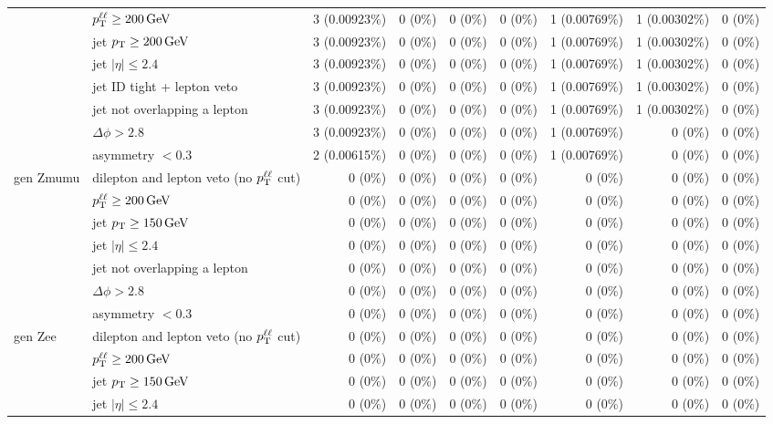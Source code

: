 \begin{tabular}{llrrrrrrr}
 & $p_{\mathrm{T}}^{\ell\ell} \geq 200\,\mathrm{GeV}$ & 3 (0.00923\%) & 0 (0\%) & 0 (0\%) & 0 (0\%) & 1 (0.00769\%) & 1 (0.00302\%) & 0 (0\%) \\
 & jet $p_{\mathrm{T}} \geq 200\,\mathrm{GeV}$ & 3 (0.00923\%) & 0 (0\%) & 0 (0\%) & 0 (0\%) & 1 (0.00769\%) & 1 (0.00302\%) & 0 (0\%) \\
 & jet $|\eta| \leq 2.4$ & 3 (0.00923\%) & 0 (0\%) & 0 (0\%) & 0 (0\%) & 1 (0.00769\%) & 1 (0.00302\%) & 0 (0\%) \\
 & jet ID tight + lepton veto & 3 (0.00923\%) & 0 (0\%) & 0 (0\%) & 0 (0\%) & 1 (0.00769\%) & 1 (0.00302\%) & 0 (0\%) \\
 & jet not overlapping a lepton & 3 (0.00923\%) & 0 (0\%) & 0 (0\%) & 0 (0\%) & 1 (0.00769\%) & 1 (0.00302\%) & 0 (0\%) \\
 & $\Delta\phi > 2.8$ & 3 (0.00923\%) & 0 (0\%) & 0 (0\%) & 0 (0\%) & 1 (0.00769\%) & 0 (0\%) & 0 (0\%) \\
 & asymmetry $< 0.3$ & 2 (0.00615\%) & 0 (0\%) & 0 (0\%) & 0 (0\%) & 1 (0.00769\%) & 0 (0\%) & 0 (0\%) \\
\midrule
gen Zmumu & dilepton and lepton veto (no $p_{\mathrm{T}}^{\ell\ell}$ cut) & 0 (0\%) & 0 (0\%) & 0 (0\%) & 0 (0\%) & 0 (0\%) & 0 (0\%) & 0 (0\%) \\
 & $p_{\mathrm{T}}^{\ell\ell} \geq 200\,\mathrm{GeV}$ & 0 (0\%) & 0 (0\%) & 0 (0\%) & 0 (0\%) & 0 (0\%) & 0 (0\%) & 0 (0\%) \\
 & jet $p_{\mathrm{T}} \geq 150\,\mathrm{GeV}$ & 0 (0\%) & 0 (0\%) & 0 (0\%) & 0 (0\%) & 0 (0\%) & 0 (0\%) & 0 (0\%) \\
 & jet $|\eta| \leq 2.4$ & 0 (0\%) & 0 (0\%) & 0 (0\%) & 0 (0\%) & 0 (0\%) & 0 (0\%) & 0 (0\%) \\
 & jet not overlapping a lepton & 0 (0\%) & 0 (0\%) & 0 (0\%) & 0 (0\%) & 0 (0\%) & 0 (0\%) & 0 (0\%) \\
 & $\Delta\phi > 2.8$ & 0 (0\%) & 0 (0\%) & 0 (0\%) & 0 (0\%) & 0 (0\%) & 0 (0\%) & 0 (0\%) \\
 & asymmetry $< 0.3$ & 0 (0\%) & 0 (0\%) & 0 (0\%) & 0 (0\%) & 0 (0\%) & 0 (0\%) & 0 (0\%) \\
\midrule
gen Zee & dilepton and lepton veto (no $p_{\mathrm{T}}^{\ell\ell}$ cut) & 0 (0\%) & 0 (0\%) & 0 (0\%) & 0 (0\%) & 0 (0\%) & 0 (0\%) & 0 (0\%) \\
 & $p_{\mathrm{T}}^{\ell\ell} \geq 200\,\mathrm{GeV}$ & 0 (0\%) & 0 (0\%) & 0 (0\%) & 0 (0\%) & 0 (0\%) & 0 (0\%) & 0 (0\%) \\
 & jet $p_{\mathrm{T}} \geq 150\,\mathrm{GeV}$ & 0 (0\%) & 0 (0\%) & 0 (0\%) & 0 (0\%) & 0 (0\%) & 0 (0\%) & 0 (0\%) \\
 & jet $|\eta| \leq 2.4$ & 0 (0\%) & 0 (0\%) & 0 (0\%) & 0 (0\%) & 0 (0\%) & 0 (0\%) & 0 (0\%) \\

\end{tabular}
